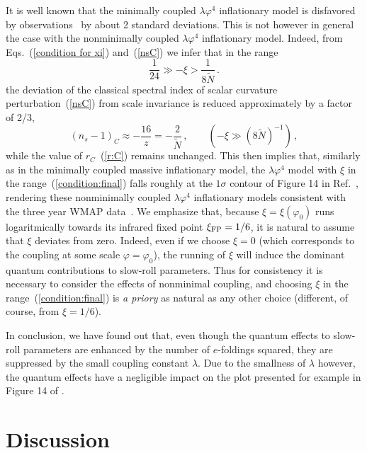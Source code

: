  It is well known that the minimally coupled
${\lambda\varphi^4}$ inflationary model is disfavored
by observations~\cite{Spergel:2006} by about 2 standard deviations.
This is not however in general the case with the nonminimally coupled
 ${\lambda\varphi^4}$ inflationary model. Indeed,
 from Eqs.~(\ref{condition for xi}) and~(\ref{nsC})
we infer that in the range
\begin{equation}
\frac{1}{24}\gg - \xi > \frac{1}{8\tilde{N}}
\,.
\label{condition:final}
\end{equation}
the deviation of the classical spectral index of scalar curvature
perturbation~(\ref{nsC}) from scale invariance
is reduced approximately by a factor of 2/3,
\begin{equation}
(n_s-1)_{C} \approx -\frac{16}{z} = - \frac{2}{\tilde N}
\,,\qquad
  (-\xi \gg (8\tilde{N})^{-1})
\,,
\label{nsC:2}
\end{equation}
while the value of $r_C$~(\ref{r:C}) remains unchanged. This then
implies that, similarly as in the minimally coupled massive
inflationary model, the $\lambda\varphi^4$ model with $\xi$ in the
range~(\ref{condition:final}) falls roughly at the $1\sigma$
contour of Figure 14 in Ref.~\cite{Spergel:2006}, rendering these
nonminimally coupled $\lambda\varphi^4$ inflationary models
consistent with the three year WMAP
data~\cite{Spergel:2006,Tsujikawa:2004my,KomatsuFutamase:1999,FakirUnruh:1990}.
We emphasize that, because $\xi=\xi(\varphi_0)$ runs logaritmically
towards its infrared fixed point $\xi_{\rm FP} = 1/6$, it is
natural to assume that $\xi$ deviates from zero. Indeed, even if
we choose $\xi=0$ (which corresponds to the coupling at some scale
$\varphi=\varphi_0$), the running of $\xi$ will induce the
dominant quantum contributions to slow-roll parameters. Thus for
consistency it is necessary to consider the effects of nonminimal
coupling, and choosing $\xi$ in the range~(\ref{condition:final})
is {\it a priory}
 as natural as any other choice (different, of course, from $\xi=1/6$).

In conclusion, we have found out that, even though the quantum
effects to slow-roll parameters are enhanced by the number of
$e$-foldings squared, they are suppressed by the small coupling
constant $\lambda$. Due to the smallness of $\lambda$ however, the
quantum effects have a negligible impact on the plot presented for
example in Figure 14 of \cite{Spergel:2006}.

\section{Discussion}
\label{Discussion}

